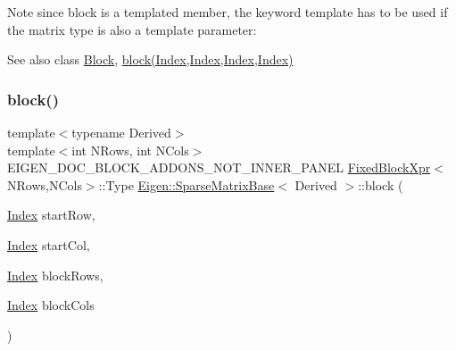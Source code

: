 \begin{DoxyNote}{Note}
since block is a templated member, the keyword template has to be used if the matrix type is also a template parameter\+:
\begin{DoxyCode}{0}
\end{DoxyCode}

\end{DoxyNote}
\begin{DoxySeeAlso}{See also}
class \mbox{\hyperlink{class_eigen_1_1_block}{Block}}, \mbox{\hyperlink{class_eigen_1_1_sparse_matrix_base_a7c28a2f511181c727396d5e813519d38}{block(\+Index,\+Index,\+Index,\+Index)}} 
\end{DoxySeeAlso}
\mbox{\label{class_eigen_1_1_sparse_matrix_base_a22a720d29fee4d4f6d3739c7596a2c25}} 
\subsubsection{\texorpdfstring{block()}{block()}\hspace{0.1cm}{\footnotesize\ttfamily [3/3]}}
{\footnotesize\ttfamily template$<$typename Derived$>$ \\
template$<$int N\+Rows, int N\+Cols$>$ \\
E\+I\+G\+E\+N\+\_\+\+D\+O\+C\+\_\+\+B\+L\+O\+C\+K\+\_\+\+A\+D\+D\+O\+N\+S\+\_\+\+N\+O\+T\+\_\+\+I\+N\+N\+E\+R\+\_\+\+P\+A\+N\+EL \mbox{\hyperlink{struct_eigen_1_1_sparse_matrix_base_1_1_fixed_block_xpr}{Fixed\+Block\+Xpr}}$<$N\+Rows,N\+Cols$>$\+::Type \mbox{\hyperlink{class_eigen_1_1_sparse_matrix_base}{Eigen\+::\+Sparse\+Matrix\+Base}}$<$ Derived $>$\+::block (\begin{DoxyParamCaption}\item[{\mbox{\hyperlink{struct_eigen_1_1_eigen_base_a554f30542cc2316add4b1ea0a492ff02}{Index}}}]{start\+Row,  }\item[{\mbox{\hyperlink{struct_eigen_1_1_eigen_base_a554f30542cc2316add4b1ea0a492ff02}{Index}}}]{start\+Col,  }\item[{\mbox{\hyperlink{struct_eigen_1_1_eigen_base_a554f30542cc2316add4b1ea0a492ff02}{Index}}}]{block\+Rows,  }\item[{\mbox{\hyperlink{struct_eigen_1_1_eigen_base_a554f30542cc2316add4b1ea0a492ff02}{Index}}}]{block\+Cols }\end{DoxyParamCaption})\hspace{0.3cm}{\ttfamily [inline]}}

